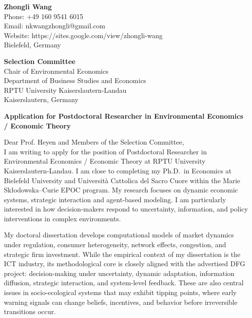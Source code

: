 \documentclass[11pt]{article}
\begin{document}
\begin{flushright}
\textbf{Zhongli Wang} \\
Phone: +49 160 9541 6015 \\
Email: nkwangzhongli@gmail.com \\
Website: https://sites.google.com/view/zhongli-wang \\
Bielefeld, Germany \\
\end{flushright}

\vspace{0.25cm}

\noindent
\textbf{Selection Committee} \\
Chair of Environmental Economics \\
Department of Business Studies and Economics \\
RPTU University Kaiserslautern-Landau \\
Kaiserslautern, Germany \\

\vspace{0.25cm}

\noindent
\textbf{Application for Postdoctoral Researcher in Environmental Economics / Economic Theory}\\

\vspace{0.15cm}

\noindent Dear Prof. Heyen and Members of the Selection Committee,\\[0.1cm]

I am writing to apply for the position of Postdoctoral Researcher in Environmental Economics / Economic Theory at RPTU University Kaiserslautern-Landau. I am close to completing my Ph.D.\ in Economics at Bielefeld University and Universit\`a Cattolica del Sacro Cuore within the Marie Sk{\l}odowska--Curie EPOC program. My research focuses on dynamic economic systems, strategic interaction and agent-based modeling. I am particularly interested in how decision-makers respond to uncertainty, information, and policy interventions in complex environments.

My doctoral dissertation develops computational models of market dynamics under regulation, consumer heterogeneity, network effects, congestion, and strategic firm investment. While the empirical context of my dissertation is the ICT industry, its methodological core is closely aligned with the advertised DFG project: decision-making under uncertainty, dynamic adaptation, information diffusion, strategic interaction, and system-level feedback. These are also central issues in socio-ecological systems that may exhibit tipping points, where early warning signals can change beliefs, incentives, and behavior before irreversible transitions occur.
\end{document}
